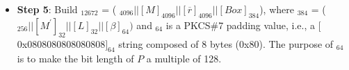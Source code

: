 \documentclass[main\_\_EN.tex]{subfiles}
\begin{document}
\begin{itemize}
    \item {\bfseries Step 5}: Build \begin{math}[P]_{12672}\end{math} = (
            \begin{math}
                [Y]_{4096} ||
                [M]_{4096} ||
                [\overline{r}]_{4096} ||
                [Box]_{384}
            \end{math}), where
            \begin{math}[Box]_{384}\end{math} = (
            \begin{math}
                [MD]_{256} ||
                [M^{\prime}]_{32} ||
                [L]_{32} ||
                [\beta]_{64})
            \end{math} and
            \begin{math}[\beta]_{64} \end{math} is a PKCS\#7 padding value, i.e., a $[$0x0808080808080808$]_{64}$ string composed of 8 bytes (0x80). The purpose of \begin{math}[\beta]_{64}\end{math} is to make the bit length of \begin{math}P\end{math} a multiple of 128.


\end{itemize}
\end{document}
